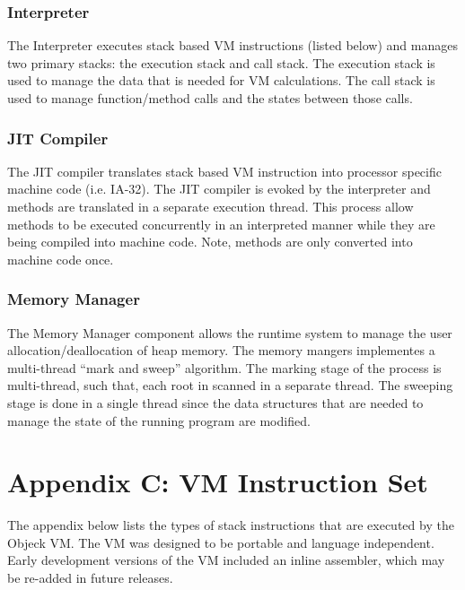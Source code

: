 \documentclass[12pt]{article}
\begin{document}
\subsubsection{Interpreter}
The Interpreter executes stack based VM instructions (listed below) and manages two primary stacks: the execution stack and call stack.  The execution stack is used to manage the data that is needed for VM calculations.  The call stack is used to manage function/method calls and the states between those calls.

\subsubsection{JIT Compiler}
The JIT compiler translates stack based VM instruction into processor specific machine code (i.e. IA-32).  The JIT compiler is evoked by the interpreter and methods are translated in a separate execution thread.  This process allow methods to be executed concurrently in an interpreted manner while they are being compiled into machine code.  Note, methods are only converted into machine code once.

\subsubsection{Memory Manager}
The Memory Manager component allows the runtime system to manage the user allocation/deallocation of heap memory.  The memory mangers implementes a multi-thread ``mark and sweep'' algorithm.  The marking stage of the process is multi-thread, such that, each root in scanned in a separate thread.  The sweeping stage is done in a single thread since the data structures that are needed to manage the state of the running program are modified.

\section{Appendix C: VM Instruction Set}
The appendix below lists the types of stack instructions that are executed by the Objeck VM.  The VM was designed to be portable and language independent.  Early development versions of the VM included an inline assembler, which may be re-added in future releases.
\end{document}
